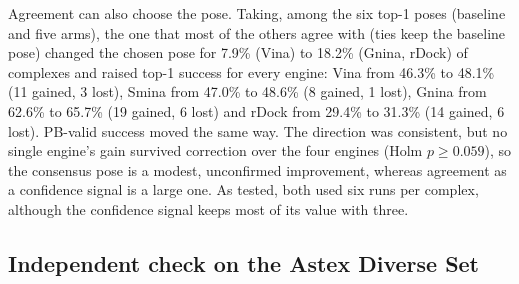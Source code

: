 Agreement can also choose the pose. Taking, among the six top-1 poses (baseline and five
arms), the one that most of the others agree with (ties keep the baseline pose) changed the
chosen pose for 7.9\% (Vina) to 18.2\% (Gnina, rDock) of complexes and raised top-1 success
for every engine: Vina from 46.3\% to 48.1\% (11 gained, 3 lost), Smina from 47.0\% to
48.6\% (8 gained, 1 lost), Gnina from 62.6\% to 65.7\% (19 gained, 6 lost) and rDock from
29.4\% to 31.3\% (14 gained, 6 lost). PB-valid success moved the same way. The direction was
consistent, but no single engine's gain survived correction over the four engines (Holm
$p \ge 0.059$), so the consensus pose is a modest, unconfirmed improvement, whereas
agreement as a confidence signal is a large one. As tested, both used six runs per complex,
although the confidence signal keeps most of its value with three.

\subsection{Independent check on the Astex Diverse Set}
\label{sec:astex}

